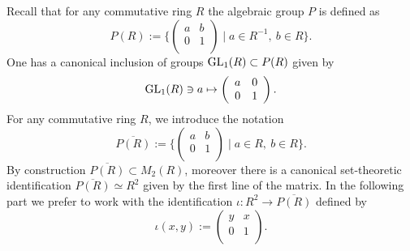 \documentclass[graybox, envcountsect%
]{svmult}
\def\GL{{\rm GL}}
\def\no{\noindent}
\begin{document}
\no Recall that for any commutative ring $R$ the algebraic group $P$ is defined as
\begin{equation}\label{alggroupP}
P(R):=\{\left(
\begin{array}{cc}
 a & b \\
 0 & 1 \\
\end{array}
\right)\mid a\in R^{-1},\ b\in R\}.
\end{equation}
One has a canonical inclusion of groups $\GL_1(R)\subset P(R)$ given by 
\begin{equation}\label{alggroupPbis}
\GL_1(R)\ni a\mapsto \left(
\begin{array}{cc}
 a & 0 \\
 0 & 1 \\
\end{array}
\right).
\end{equation}
For any commutative ring $R$, we introduce the notation
\begin{equation}\label{algspaceP}
\overline{P(R)}:=\{\left(
\begin{array}{cc}
 a & b \\
 0 & 1 \\
\end{array}
\right)\mid a\in R,\ b\in R\}.
\end{equation}
By construction $\overline{P(R)}\subset M_2(R)$, moreover there is a canonical set-theoretic  identification $\overline{P(R)}\simeq R^2$ given by the first line of the matrix. In the following part we prefer to work with the identification $\iota:R^2\to \overline{P(R)}$ defined by 
\begin{equation}\label{algspaceiota}
\iota(x,y):=\left(
\begin{array}{cc}
 y & x \\
 0 & 1 \\
\end{array}
\right).
\end{equation}
\end{document}
